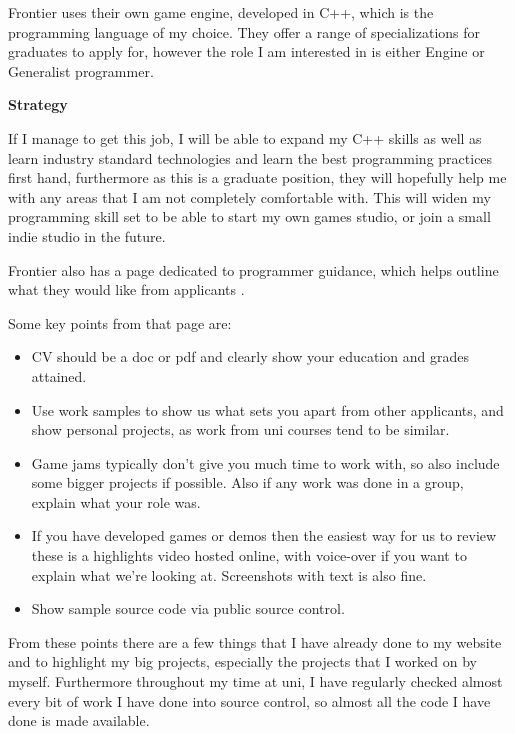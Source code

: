\documentclass{scrartcl}
\begin{document}
Frontier uses their own game engine, developed in C++, which is the programming language of my choice.
They offer a range of specializations for graduates to apply for, however the role I am interested in is either Engine or Generalist programmer.

\textbf{Strategy} 

If I manage to get this job, I will be able to expand my C++ skills as well as learn industry standard technologies and learn the best programming practices first hand, furthermore as this is a graduate position, they will hopefully help me with any areas that I am not completely comfortable with.
This will widen my programming skill set to be able to start my own games studio, or join a small indie studio in the future.


 Frontier also has a page dedicated to programmer guidance, which helps outline what they would like from applicants \cite{FrontierAdvice}.

Some key points from that page are:
\begin{itemize}
	\item CV should be a doc or pdf and clearly show your education and grades attained.
	\item Use work samples to show us what sets you apart from other applicants, and show personal projects, as work from uni courses tend to be similar.
	\item Game jams typically don't give you much time to work with, so also include some bigger projects if possible. Also if any work was done in a group, explain what your role was.
	\item If you have developed games or demos then the easiest way for us to review these is a highlights video hosted online, with voice-over if you want to explain what we're looking at. Screenshots with text is also fine.
	\item Show sample source code via public source control.
\end{itemize}

From these points there are a few things that I have already done to my website and to highlight my big projects,  especially the projects that I worked on by myself.
Furthermore throughout my time at uni, I have regularly checked almost every bit of work I have done into source control, so almost all the code I have done is made available.
\end{document}

